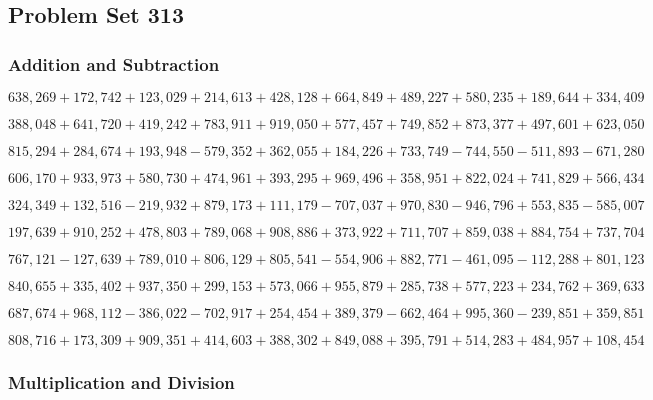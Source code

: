 \hypertarget{problem-set-313}{%
\subsection{Problem Set 313}\label{problem-set-313}}

\hypertarget{addition-and-subtraction}{%
\subsubsection{Addition and
Subtraction}\label{addition-and-subtraction}}

\(638,269+172,742+123,029+214,613+428,128+664,849+489,227+580,235+189,644+334,409\)

\(388,048+641,720+419,242+783,911+919,050+577,457+749,852+873,377+497,601+623,050\)

\(815,294+284,674+193,948-579,352+362,055+184,226+733,749-744,550-511,893-671,280\)

\(606,170+933,973+580,730+474,961+393,295+969,496+358,951+822,024+741,829+566,434\)

\(324,349+132,516-219,932+879,173+111,179-707,037+970,830-946,796+553,835-585,007\)

\(197,639+910,252+478,803+789,068+908,886+373,922+711,707+859,038+884,754+737,704\)

\(767,121-127,639+789,010+806,129+805,541-554,906+882,771-461,095-112,288+801,123\)

\(840,655+335,402+937,350+299,153+573,066+955,879+285,738+577,223+234,762+369,633\)

\(687,674+968,112-386,022-702,917+254,454+389,379-662,464+995,360-239,851+359,851\)

\(808,716+173,309+909,351+414,603+388,302+849,088+395,791+514,283+484,957+108,454\)

\hypertarget{multiplication-and-division}{%
\subsubsection{Multiplication and
Division}\label{multiplication-and-division}}

